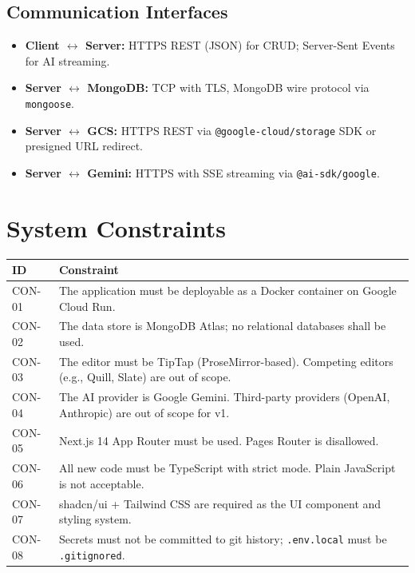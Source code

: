 \documentclass[12pt, a4paper]{article}
\begin{document}
\subsection{Communication Interfaces}

\begin{itemize}[leftmargin=2em]
  \item \textbf{Client $\leftrightarrow$ Server:} HTTPS REST (JSON) for CRUD;
        Server-Sent Events for AI streaming.
  \item \textbf{Server $\leftrightarrow$ MongoDB:} TCP with TLS, MongoDB wire
        protocol via \texttt{mongoose}.
  \item \textbf{Server $\leftrightarrow$ GCS:} HTTPS REST via
        \texttt{@google-cloud/storage} SDK or presigned URL redirect.
  \item \textbf{Server $\leftrightarrow$ Gemini:} HTTPS with SSE streaming via
        \texttt{@ai-sdk/google}.
\end{itemize}

\section{System Constraints}
\label{sec:constraints}

\begin{longtable}{@{}C{1.6cm} L{11.5cm}@{}}
  \toprule
  \textbf{ID} & \textbf{Constraint} \\
  \midrule\endhead
  \bottomrule\endfoot
  CON-01 & The application must be deployable as a Docker container on Google
           Cloud Run. \\
  CON-02 & The data store is MongoDB Atlas; no relational databases shall be
           used. \\
  CON-03 & The editor must be TipTap (ProseMirror-based). Competing editors
           (e.g., Quill, Slate) are out of scope. \\
  CON-04 & The AI provider is Google Gemini. Third-party providers (OpenAI,
           Anthropic) are out of scope for v1. \\
  CON-05 & Next.js 14 App Router must be used. Pages Router is disallowed. \\
  CON-06 & All new code must be TypeScript with strict mode. Plain JavaScript
           is not acceptable. \\
  CON-07 & shadcn/ui + Tailwind CSS are required as the UI component and
           styling system. \\
  CON-08 & Secrets must not be committed to git history; \texttt{.env.local}
           must be \texttt{.gitignored}. \\
\end{longtable}
\end{document}
